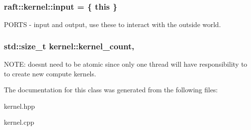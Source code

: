 \subsubsection[{input}]{ raft\+::kernel\+::input = \{ this \}\hspace{0.3cm}{\ttfamily [protected]}}\label{classraft_1_1kernel_a6edbe35a56409d402e719b3ac36d6554}
P\+O\+R\+T\+S -\/ input and output, use these to interact with the outside world. \hypertarget{classraft_1_1kernel_a98e05f7418c208e28b9112e92df7eccf}{}
\subsubsection[{kernel\+\_\+count}]{\setlength{\rightskip}{0pt plus 5cm}std\+::size\+\_\+t kernel\+::kernel\+\_\+count\hspace{0.3cm}{\ttfamily [static]}, {\ttfamily [protected]}}\label{classraft_1_1kernel_a98e05f7418c208e28b9112e92df7eccf}
N\+O\+T\+E\+: doesn\textquotesingle{}t need to be atomic since only one thread will have responsibility to to create new compute kernels. 

The documentation for this class was generated from the following files\+:\begin{DoxyCompactItemize}
\item 
kernel.\+hpp\item 
kernel.\+cpp\end{DoxyCompactItemize}
